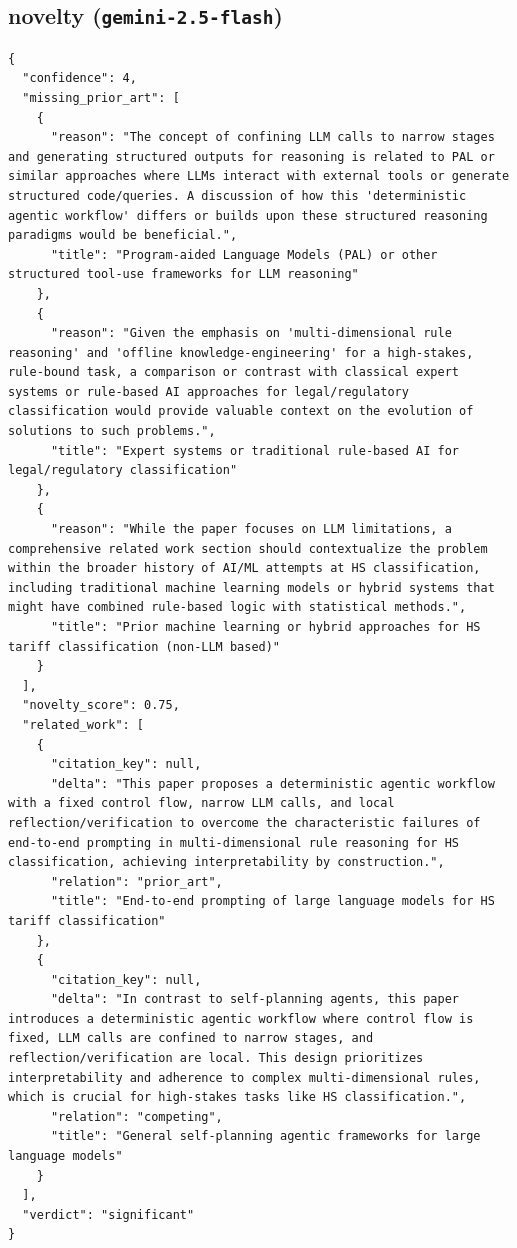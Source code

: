 \documentclass[11pt]{article}
\begin{document}
\subsection*{novelty (\texttt{gemini-2.5-flash})}
\begin{verbatim}
{
  "confidence": 4,
  "missing_prior_art": [
    {
      "reason": "The concept of confining LLM calls to narrow stages and generating structured outputs for reasoning is related to PAL or similar approaches where LLMs interact with external tools or generate structured code/queries. A discussion of how this 'deterministic agentic workflow' differs or builds upon these structured reasoning paradigms would be beneficial.",
      "title": "Program-aided Language Models (PAL) or other structured tool-use frameworks for LLM reasoning"
    },
    {
      "reason": "Given the emphasis on 'multi-dimensional rule reasoning' and 'offline knowledge-engineering' for a high-stakes, rule-bound task, a comparison or contrast with classical expert systems or rule-based AI approaches for legal/regulatory classification would provide valuable context on the evolution of solutions to such problems.",
      "title": "Expert systems or traditional rule-based AI for legal/regulatory classification"
    },
    {
      "reason": "While the paper focuses on LLM limitations, a comprehensive related work section should contextualize the problem within the broader history of AI/ML attempts at HS classification, including traditional machine learning models or hybrid systems that might have combined rule-based logic with statistical methods.",
      "title": "Prior machine learning or hybrid approaches for HS tariff classification (non-LLM based)"
    }
  ],
  "novelty_score": 0.75,
  "related_work": [
    {
      "citation_key": null,
      "delta": "This paper proposes a deterministic agentic workflow with a fixed control flow, narrow LLM calls, and local reflection/verification to overcome the characteristic failures of end-to-end prompting in multi-dimensional rule reasoning for HS classification, achieving interpretability by construction.",
      "relation": "prior_art",
      "title": "End-to-end prompting of large language models for HS tariff classification"
    },
    {
      "citation_key": null,
      "delta": "In contrast to self-planning agents, this paper introduces a deterministic agentic workflow where control flow is fixed, LLM calls are confined to narrow stages, and reflection/verification are local. This design prioritizes interpretability and adherence to complex multi-dimensional rules, which is crucial for high-stakes tasks like HS classification.",
      "relation": "competing",
      "title": "General self-planning agentic frameworks for large language models"
    }
  ],
  "verdict": "significant"
}
\end{verbatim}
\end{document}
